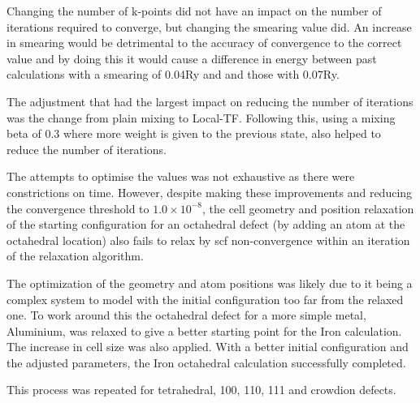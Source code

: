 Changing the number of k-points did not have an impact on the number of iterations required to converge, but changing the smearing value did.  An increase in smearing would be detrimental to the accuracy of convergence to the correct value and by doing this it would cause a difference in energy between past calculations with a smearing of 0.04Ry and and those with 0.07Ry.

The adjustment that had the largest impact on reducing the number of iterations was the change from plain mixing to Local-TF.  Following this, using a mixing beta of 0.3 where more weight is given to the previous state, also helped to reduce the number of iterations.

The attempts to optimise the values was not exhaustive as there were constrictions on time.  However, despite making these improvements and reducing the convergence threshold to $1.0 \times 10^{-8}$, the cell geometry and position relaxation of the starting configuration for an octahedral defect (by adding an atom at the octahedral location) also fails to relax by \acrshort{scf} non-convergence within an iteration of the relaxation algorithm. 

The optimization of the geometry and atom positions was likely due to it being a complex system to model with the initial configuration too far from the relaxed one.  To work around this the octahedral defect for a more simple metal, Aluminium, was relaxed to give a better starting point for the Iron calculation.  The increase in cell size was also applied.  With a better initial configuration and the adjusted parameters, the Iron octahedral calculation successfully completed.

This process was repeated for tetrahedral, 100, 110, 111 and crowdion defects.














